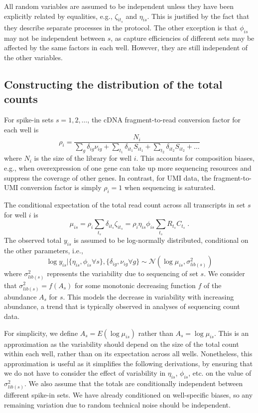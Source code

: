 \documentclass{article}
\begin{document}
All random variables are assumed to be independent unless they have been explicitly related by equalities, e.g., $\zeta_{it_s}$ and $\eta_{is}$.
This is justified by the fact that they describe separate processes in the protocol.
The other exception is that $\phi_{is}$ may not be independent between $s$, as capture efficiencies of different sets may be affected by the same factors in each well.
However, they are still independent of the other variables.

\subsection{Constructing the distribution of the total counts}
For spike-in sets $s=1, 2, \ldots$, the cDNA fragment-to-read conversion factor for each well is
\[
    \rho_i = \frac{N_i}{\sum_g \delta_{ig}\nu_{ig} + \sum_{t_1} \delta_{it_1} S_{it_1}  + \sum_{t_2} \delta_{it_2} S_{it_2} + \ldots} 
\]
where $N_i$ is the size of the library for well $i$.
This accounts for composition biases, e.g., when overexpression of one gene can take up more sequencing resources and suppress the coverage of other genes.
In contrast, for UMI data, the fragment-to-UMI conversion factor is simply $\rho_i = 1$ when sequencing is saturated.

The conditional expectation of the total read count across all transcripts in set $s$ for well $i$ is
\[
    \mu_{is} = \rho_i  \textstyle\sum_{t_s} \delta_{it_s} \zeta_{it_s} = \rho_i  \eta_{is} \phi_{is} \sum_{t_s} R_{t_s} C_{t_s} \;.
\]
The observed total $y_{is}$ is assumed to be log-normally distributed, conditional on the other parameters, i.e., 
\[
    \log y_{is} | \{ \eta_{is}, \phi_{is} \forall s \}, \{ \delta_{ig}, \nu_{ig} \forall g \} \sim \mathcal{N}(\log \mu_{is}, \sigma^2_{lib(s)})
\]
where $\sigma^2_{lib(s)}$ represents the variability due to sequencing of set $s$.
We consider that $\sigma^2_{lib(s)} = f(A_s)$ for some monotonic decreasing function $f$ of the abundance $A_s$ for $s$.
This models the decrease in variability with increasing abundance, a trend that is typically observed in analyses of sequencing count data.

For simplicity, we define $A_s = E(\log \mu_{is})$ rather than $A_s = \log \mu_{is}$.
This is an approximation as the variability should depend on the size of the total count within each well, rather than on its expectation across all wells.
Nonetheless, this approximation is useful as it simplifies the following derivations, by ensuring that we do not have to consider the effect of variability in $\eta_{is}$, $\phi_{is}$, etc. on the value of $\sigma^2_{lib(s)}$.
We also assume that the totals are conditionally independent between different spike-in sets.
We have already conditioned on well-specific biases, so any remaining variation due to random technical noise should be independent.
\end{document}
